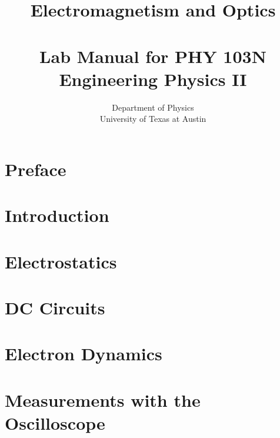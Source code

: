 \documentclass[12pt,letterpaper]{book}
\title{{\huge Electromagnetism and Optics} \\ 
\ \\
{\Large \bf Lab Manual for PHY 103N \\
Engineering Physics II}}
\author{ Department of Physics \\ 
 University of Texas at Austin}
\date{\the\year}
\begin{document}
\maketitle

\renewcommand{\thepage}{\roman{page}}

\tableofcontents

\renewcommand{\chaptername}{}
\renewcommand{\thechapter}{}

\chapter{Preface}  %


\renewcommand{\chaptername}{Chapter}

\renewcommand{\thepage}{\arabic{page}}
\setcounter{page}{0}

\renewcommand{\thechapter}{0}

\chapter{Introduction}
\label{ch:intro}


\renewcommand{\thechapter}{\arabic{chapter}}
\setcounter{chapter}{0}


\chapter{Electrostatics}


\chapter{DC Circuits}


\chapter{Electron Dynamics}


\chapter{Measurements with the Oscilloscope}

\end{document}
